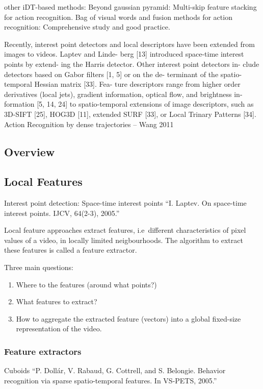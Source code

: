 other iDT-based methods: Beyond gaussian pyramid: Multi-skip feature stacking for action recognition.
Bag of visual words and fusion methods for action recognition: Comprehensive study and good practice.

Recently, interest point detectors and local descriptors have
been extended from images to videos. Laptev and Linde-
berg [13] introduced space-time interest points by extend-
ing the Harris detector. Other interest point detectors in-
clude detectors based on Gabor filters [1, 5] or on the de-
terminant of the spatio-temporal Hessian matrix [33]. Fea-
ture descriptors range from higher order derivatives (local
jets), gradient information, optical flow, and brightness in-
formation [5, 14, 24] to spatio-temporal extensions of image descriptors, such as 3D-SIFT [25], HOG3D [11], extended
SURF [33], or Local Trinary Patterns [34]. Action Recognition by dense trajectories -- Wang 2011

\subsection{Overview}

\subsection{Local Features}

Interest point detection: Space-time interest points ``I. Laptev. On space-time interest points. IJCV, 64(2-3), 2005.''

Local feature approaches extract features, i.e\ different characteristics of pixel values of a video, in locally limited neigbourhoods.
The algorithm to extract these features is called a feature extractor.

Three main questions:
\begin{enumerate}
    \item Where to the features (around what points?)
    \item What features to extract?
    \item How to aggregate the extracted feature (vectors) into a global fixed-size representation of the video.
\end{enumerate}

\subsubsection{Feature extractors}

Cuboids ``P. Dollár, V. Rabaud, G. Cottrell, and S. Belongie. Behavior recognition via sparse spatio-temporal features. In VS-PETS, 2005.''

